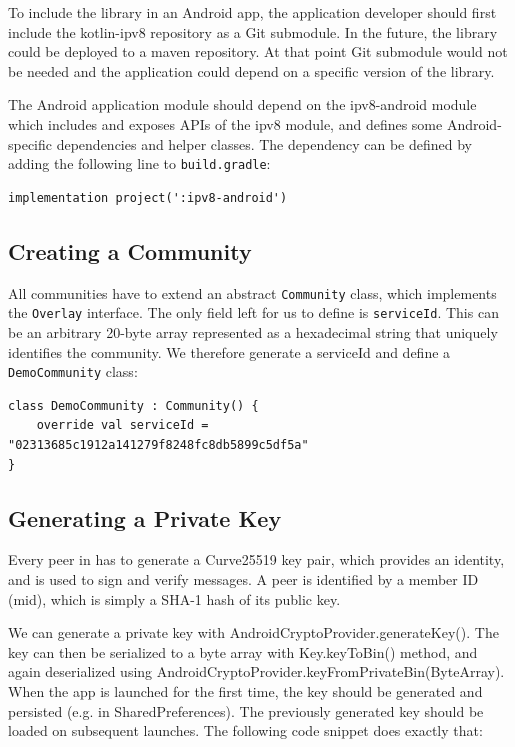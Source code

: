 To include the library in an Android app, the application developer should first include the kotlin-ipv8 repository as a Git submodule. In the future, the library could be deployed to a maven repository. At that point Git submodule would not be needed and the application could depend on a specific version of the library.

The Android application module should depend on the ipv8-android module which includes and exposes APIs of the ipv8 module, and defines some Android-specific dependencies and helper classes. The dependency can be defined by adding the following line to \texttt{build.gradle}:

\begin{verbatim}
implementation project(':ipv8-android')
\end{verbatim}

\subsection{Creating a Community}

All communities have to extend an abstract \texttt{Community} class, which implements the \texttt{Overlay} interface. The only field left for us to define is \texttt{serviceId}. This can be an arbitrary 20-byte array represented as a hexadecimal string that uniquely identifies the community. We therefore generate a serviceId and define a \texttt{DemoCommunity} class:

\begin{verbatim}
class DemoCommunity : Community() {
    override val serviceId = "02313685c1912a141279f8248fc8db5899c5df5a"
}
\end{verbatim}


\subsection{Generating a Private Key}

Every peer in has to generate a Curve25519 key pair, which provides an identity, and is used to sign and verify messages. A peer is identified by a member ID (mid), which is simply a SHA-1 hash of its public key.

We can generate a private key with AndroidCryptoProvider.generateKey(). The key can then be serialized to a byte array with Key.keyToBin() method, and again deserialized using AndroidCryptoProvider.keyFromPrivateBin(ByteArray). When the app is launched for the first time, the key should be generated and persisted (e.g. in SharedPreferences). The previously generated key should be loaded on subsequent launches. The following code snippet does exactly that:

